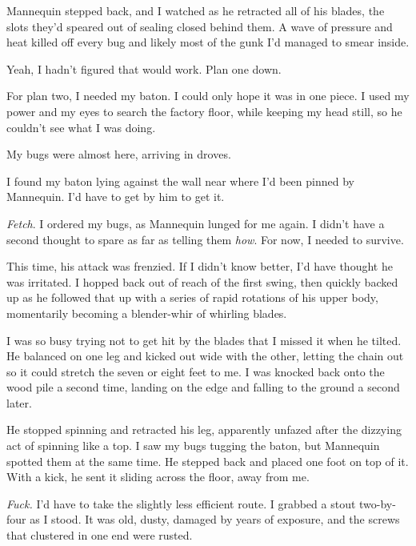 Mannequin stepped back, and I watched as he retracted all of his blades, the slots they'd speared out of sealing closed behind them.  A wave of pressure and heat killed off every bug and likely most of the gunk I'd managed to smear inside.



Yeah, I hadn't figured that would work.  Plan one down.



For plan two, I needed my baton.  I could only hope it was in one piece.  I used my power and my eyes to search the factory floor, while keeping my head still, so he couldn't see what I was doing.



My bugs were almost here, arriving in droves.



I found my baton lying against the wall near where I'd been pinned by Mannequin.  I'd have to get by him to get it.



\emph{Fetch}.  I ordered my bugs, as Mannequin lunged for me again.  I didn't have a second thought to spare as far as telling them \emph{how}.  For now, I needed to survive.



This time, his attack was frenzied.  If I didn't know better, I'd have thought he was irritated.  I hopped back out of reach of the first swing, then quickly backed up as he followed that up with a series of rapid rotations of his upper body, momentarily becoming a blender-whir of whirling blades.



I was so busy trying not to get hit by the blades that I missed it when he tilted.  He balanced on one leg and kicked out wide with the other, letting the chain out so it could stretch the seven or eight feet to me.  I was knocked back onto the wood pile a second time, landing on the edge and falling to the ground a second later.



He stopped spinning and retracted his leg, apparently unfazed after the dizzying act of spinning like a top.  I saw my bugs tugging the baton, but Mannequin spotted them at the same time.  He stepped back and placed one foot on top of it.  With a kick, he sent it sliding across the floor, away from me.



\emph{Fuck.}  I'd have to take the slightly less efficient route.  I grabbed a stout two-by-four as I stood.  It was old, dusty, damaged by years of exposure, and the screws that clustered in one end were rusted.



